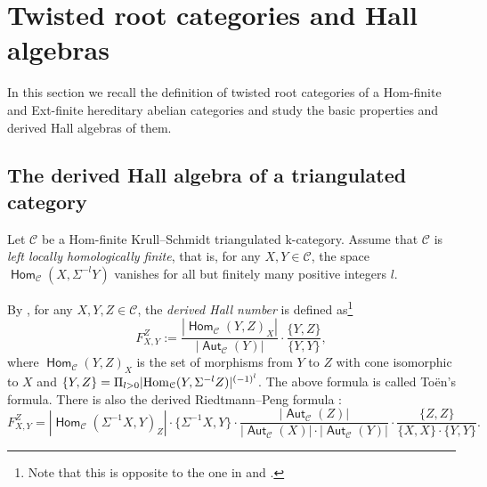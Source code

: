 \documentclass[reqno,12pt,a4paper]{amsart}
\theoremstyle{remark}
\theoremstyle{definition}
\newcommand{\opname}[1]{\operatorname{\mathsf{#1}}}
\newcommand{\Hom}{\opname{Hom}}
\newcommand{\Aut}{\opname{Aut}}
\newcommand{\cc}{{\mathcal C}}
\newcommand{\fk}{{\mathrm k}}
\numberwithin{equation}{section}
\begin{document}
\section{Twisted root categories and Hall algebras}
\label{s:twisted-root-category}
In this section we recall the definition of twisted root categories of a Hom-finite and Ext-finite hereditary abelian categories and study the basic properties and derived Hall algebras of them.
\subsection{The derived Hall algebra of a triangulated category}
\label{ss:derived-Hall-algebra-of-triangulated-cat}
Let $\mathcal{C}$ be a Hom-finite Krull--Schmidt triangulated $\fk$-category. Assume that $\cc$ is \emph{left locally homologically finite}, that is,  for any $X, Y\in \mathcal{C}$, the space $\Hom_\cc(X,\Sigma^{-l}Y)$ vanishes for all but finitely many positive integers $l$.

By \cite{Toen06,XiaoXu06}, for any $X,Y,Z\in \mathcal{C}$, the \emph{derived Hall number} is defined as\footnote{Note that this is opposite to the one in \cite{Toen06} and \cite{XiaoXu06}.}
\[F_{X,Y}^Z:=\frac{|\Hom_\cc(Y,Z)_X|}{|\Aut_\cc(Y)|}\cdot \frac{\{Y,Z\}}{\{Y,Y\}},\]
where $\Hom_\cc(Y,Z)_X$ is the set of morphisms from $Y$ to $Z$ with cone isomorphic to $X$ and $\{Y,Z\}=\Pi_{l>0}|{\rm Hom}_\mathcal{C}(Y,\Sigma^{-l}Z)|^{(-1)^l}$. The above formula is called  To\"{e}n's formula. There is also the derived Riedtmann--Peng formula \cite{XiaoXu15}:
\[
F_{X,Y}^Z=|\Hom_\cc(\Sigma^{-1}X,Y)_Z|\cdot\{\Sigma^{-1}X,Y\}\cdot\frac{|\Aut_\cc(Z)|}{|\Aut_\cc(X)|\cdot|\Aut_\cc(Y)|}\cdot\frac{\{Z,Z\}}{\{X,X\}\cdot\{Y,Y\}}.
\]
\end{document}
